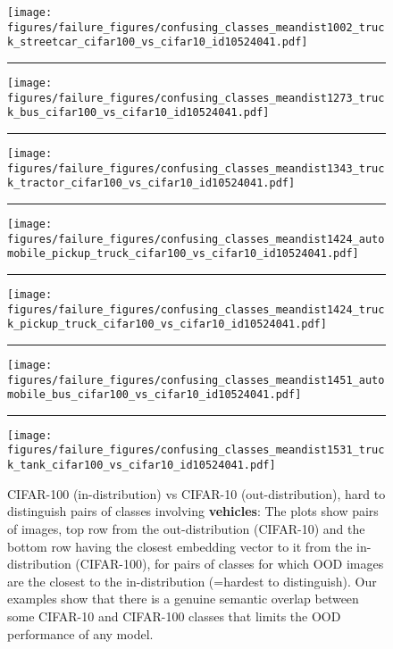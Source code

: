 \documentclass{article}
\begin{document}
\begin{figure}[ht]
	\centering
	\vspace{-5.0em}
	\texttt{[image: figures/failure\_figures/confusing\_classes\_meandist1002\_truck\_streetcar\_cifar100\_vs\_cifar10\_id10524041.pdf]}
\hrule
    \texttt{[image: figures/failure\_figures/confusing\_classes\_meandist1273\_truck\_bus\_cifar100\_vs\_cifar10\_id10524041.pdf]}
    \hrule
    \texttt{[image: figures/failure\_figures/confusing\_classes\_meandist1343\_truck\_tractor\_cifar100\_vs\_cifar10\_id10524041.pdf]}
    \hrule
\texttt{[image: figures/failure\_figures/confusing\_classes\_meandist1424\_automobile\_pickup\_truck\_cifar100\_vs\_cifar10\_id10524041.pdf]}
    \hrule
    \texttt{[image: figures/failure\_figures/confusing\_classes\_meandist1424\_truck\_pickup\_truck\_cifar100\_vs\_cifar10\_id10524041.pdf]}
    \hrule
    \texttt{[image: figures/failure\_figures/confusing\_classes\_meandist1451\_automobile\_bus\_cifar100\_vs\_cifar10\_id10524041.pdf]}
    \hrule
    \texttt{[image: figures/failure\_figures/confusing\_classes\_meandist1531\_truck\_tank\_cifar100\_vs\_cifar10\_id10524041.pdf]}
	\caption{CIFAR-100 (in-distribution) vs CIFAR-10 (out-distribution), hard to distinguish pairs of classes involving \textbf{vehicles}: The plots show pairs of images, top row from the out-distribution (CIFAR-10) and the bottom row having the closest embedding vector to it from the in-distribution (CIFAR-100), for pairs of classes for which OOD images are the closest to the in-distribution (=hardest to distinguish). Our examples show that there is a genuine semantic overlap between some CIFAR-10 and CIFAR-100 classes that limits the OOD performance of any model.}
	\vspace{-1em}
	\label{fig:confusing_class_pairs_vehicles}
\end{figure}
\end{document}
